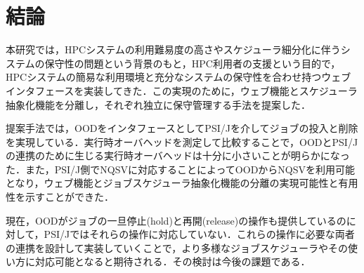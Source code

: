 \documentclass[a4paper,oneside,twocolumn,notitlepage,dvipdfmx]{jsarticle}
\begin{document}
\section{結論}
本研究では，HPCシステムの利用難易度の高さやスケジューラ細分化に伴うシステムの保守性の問題という背景のもと，HPC利用者の支援という目的で，HPCシステムの簡易な利用環境と充分なシステムの保守性を合わせ持つウェブインタフェースを実装してきた．この実現のために，ウェブ機能とスケジューラ抽象化機能を分離し，それぞれ独立に保守管理する手法を提案した．\par
提案手法では，OODをインタフェースとしてPSI/Jを介してジョブの投入と削除を実現している．実行時オーバヘッドを測定して比較することで，OODとPSI/Jの連携のために生じる実行時オーバヘッドは十分に小さいことが明らかになった．また，PSI/J側でNQSVに対応することによってOODからNQSVを利用可能となり，ウェブ機能とジョブスケジューラ抽象化機能の分離の実現可能性と有用性を示すことができた．\par
現在，OODがジョブの一旦停止(hold)と再開(release)の操作も提供しているのに対して，PSI/Jではそれらの操作に対応していない．これらの操作に必要な両者の連携を設計して実装していくことで，より多様なジョブスケジューラやその使い方に対応可能となると期待される．その検討は今後の課題である．\par

\vspace{3\baselineskip}


\end{document}
